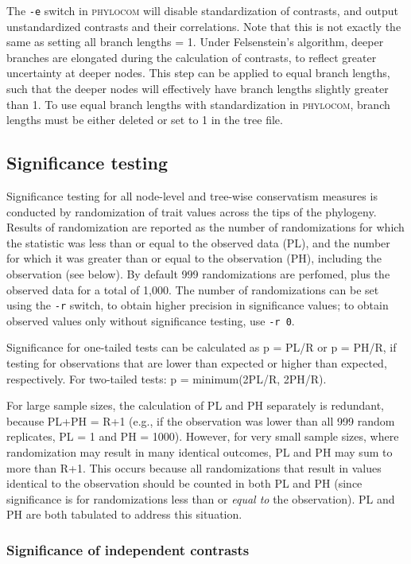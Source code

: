 \documentclass[12pt,letterpaper]{article}
\begin{document}
The \verb|-e| switch in {\scshape phylocom} will disable standardization of
contrasts, and output unstandardized contrasts and their
correlations. Note that this is not exactly the same as setting all
branch lengths = 1. Under Felsenstein's algorithm, deeper branches are
elongated during the calculation of contrasts, to reflect greater
uncertainty at deeper nodes. This step can be applied to equal branch
lengths, such that the deeper nodes will effectively have branch
lengths slightly greater than 1. To use equal branch lengths with
standardization in {\scshape phylocom}, branch lengths must be either
deleted or set to 1 in the tree file.  

\subsection{Significance testing}

Significance testing for all node-level and tree-wise conservatism
measures is conducted by randomization of trait values across the tips
of the phylogeny. Results of randomization are reported as the number
of randomizations for which the statistic was less than or equal to
the observed data (PL), and the number for which it was greater than
or equal to the observation (PH), including the observation (see
below). By default 999 randomizations are perfomed, plus the observed
data for a total of 1,000. The number of randomizations can be set
using the \verb|-r| switch, to obtain higher precision in significance
values; to obtain observed values only without significance testing,
use \verb|-r 0|.

Significance for one-tailed tests can be calculated as p = PL/R or p =
PH/R, if testing for observations that are lower than expected or
higher than expected, respectively. For two-tailed tests: p =
minimum(2PL/R, 2PH/R).

For large sample sizes, the calculation of PL and PH separately is
redundant, because PL+PH = R+1 (e.g., if the observation was lower
than all 999 random replicates, PL = 1 and PH = 1000). However, for
very small sample sizes, where randomization may result in many
identical outcomes, PL and PH may sum to more than R+1. This occurs
because all randomizations that result in values identical to the
observation should be counted in both PL and PH (since significance is
for randomizations less than or \textit{equal to} the observation). PL
and PH are both tabulated to address this situation.

\subsubsection{Significance of independent contrasts}
\end{document}

